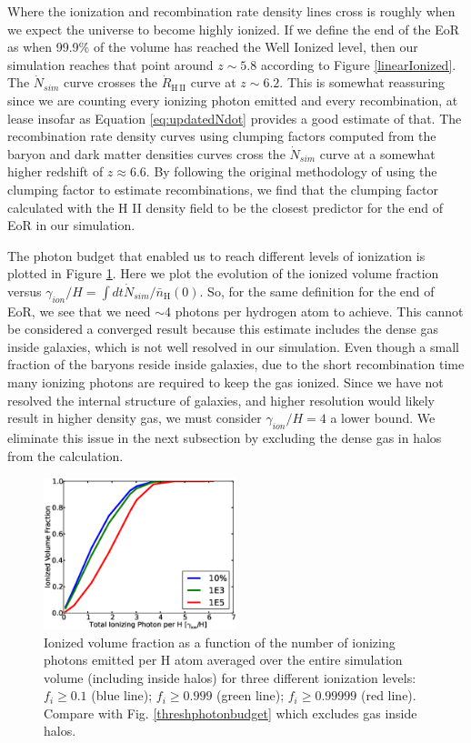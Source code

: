 Where the ionization and recombination rate density lines cross is roughly when we expect the universe to become highly ionized.
If we define the end of the EoR as when 99.9\% of the volume has  reached the Well Ionized level, then our simulation reaches that point around $z\sim5.8$ according to Figure \ref{linearIonized}.  The $\dot{N}_{sim}$ curve crosses the $\dot{R}_\mathrm{H\,II}$ curve at $z\sim6.2$. This is somewhat reassuring since we are counting every ionizing photon emitted and every recombination, at lease insofar as Equation \eqref{eq:updatedNdot} provides a good estimate of that. The recombination rate density curves using clumping factors computed from the baryon and dark matter densities curves cross the $\dot{N}_{sim}$ curve at a somewhat higher redshift of $z \approx 6.6$. By following the original methodology of using the clumping factor to estimate recombinations, we find that the clumping factor calculated with the H {\footnotesize II} density field to be the closest predictor for the end of EoR in our simulation. 

The photon budget that enabled us to reach different levels of ionization is plotted in Figure \ref{unthreshphotonbudget}.  
Here we plot the evolution of the ionized volume fraction versus $\gamma_{ion}/H=\int dt \dot{N}_{sim} / \bar{n}_\mathrm{H}(0)$. So, for the same definition for the end of EoR, we see that we need $\sim$4 photons per hydrogen atom to  achieve. This cannot be considered a converged result because this estimate includes the dense gas inside galaxies, which is not well resolved in our simulation. Even though a small fraction of the baryons reside inside galaxies, due to the short recombination time many ionizing photons are required to keep the gas ionized.  Since we have not resolved the internal structure of galaxies, and higher resolution would likely result in higher density gas, we must consider $\gamma_{ion}/H=4$ a lower bound. We eliminate this issue in the next subsection by excluding the dense gas in halos from the calculation. 

\begin{figure}
	\includegraphics[width=0.5\textwidth]{unthresh_photon_per_H.eps}
	\caption{Ionized volume fraction as a function of the number of ionizing photons emitted per H atom averaged over the entire simulation volume (including inside halos) for three different ionization levels: $f_i \geq 0.1$ (blue line);  $f_i \geq 0.999$ (green line); $f_i \geq 0.99999$ (red line). Compare with Fig. \ref{threshphotonbudget} which excludes gas inside halos.}
	\label{unthreshphotonbudget}
\end{figure}


